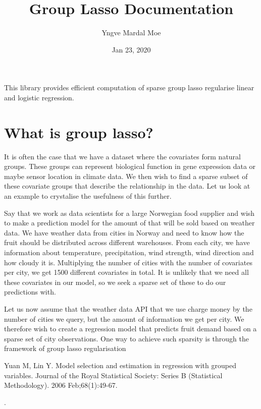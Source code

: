 \documentclass[letterpaper,10pt,english]{sphinxmanual}
\title{Group Lasso Documentation}
\date{Jan 23, 2020}
\author{Yngve Mardal Moe}
\begin{document}
\pagestyle{empty}
\sphinxmaketitle
\pagestyle{plain}
\sphinxtableofcontents
\pagestyle{normal}
\label{\detokenize{index::doc}}


This library provides efficient computation of sparse group lasso regularise
linear and logistic regression.


\chapter{What is group lasso?}
\label{\detokenize{index:what-is-group-lasso}}
It is often the case that we have a dataset where the covariates form natural
groups. These groups can represent biological function in gene expression
data or maybe sensor location in climate data. We then wish to find a sparse
subset of these covariate groups that describe the relationship in the data.
Let us look at an example to crystalise the usefulness of this further.

Say that we work as data scientists for a large Norwegian food supplier and
wish to make a prediction model for the amount of that will be sold based on
weather data. We have weather data from cities in Norway and need to know how
the fruit should be distributed across different warehouses. From each city,
we have information about temperature, precipitation, wind strength, wind
direction and how cloudy it is. Multiplying the number of cities with the
number of covariates per city, we get 1500 different covariates in total.
It is unlikely that we need all these covariates in our model, so we seek a
sparse set of these to do our predictions with.

Let us now assume that the weather data API that we use charge money by
the number of cities we query, but the amount of information we get per
city. We therefore wish to create a regression model that predicts fruit
demand based on a sparse set of city observations. One way to achieve such
sparsity is through the framework of group lasso regularisation %
\begin{footnote}[1]\sphinxAtStartFootnote
Yuan M, Lin Y. Model selection and estimation in regression with
grouped variables. Journal of the Royal Statistical Society: Series B
(Statistical Methodology). 2006 Feb;68(1):49-67.
%
\end{footnote}.
\end{document}
